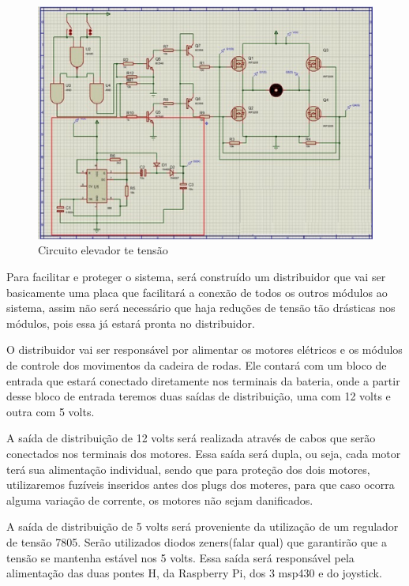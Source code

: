 \begin{figure}[!htb]
	\centering
	\includegraphics[keepaspectratio=true,scale=0.8]{figuras/referencialteorico/figurax_4.eps}
	\caption{Circuito elevador te tensão}
	\label{fig:figx+4}
\end{figure}


Para facilitar e proteger o sistema, será construído um distribuidor que vai ser basicamente uma placa que facilitará a conexão de todos os outros módulos ao sistema, assim não será necessário que haja reduções de tensão tão drásticas nos módulos, pois essa já estará pronta no distribuidor.

O distribuidor vai ser responsável por alimentar os motores elétricos e os módulos de controle dos movimentos da cadeira de rodas. Ele contará com um bloco de entrada que estará conectado diretamente nos terminais da bateria, onde a partir desse bloco de entrada teremos duas saídas de distribuição, uma com 12 volts e outra com 5 volts.

A saída de distribuição de 12 volts será realizada através de cabos que serão conectados nos terminais dos motores. Essa saída será dupla, ou seja, cada motor terá sua alimentação individual, sendo que para proteção dos dois motores, utilizaremos fuzíveis inseridos antes dos plugs dos moteres, para que caso ocorra alguma variação de corrente, os motores não sejam danificados.

A saída de distribuição de 5 volts será proveniente da utilização de um regulador de tensão 7805. Serão utilizados diodos zeners(falar qual) que garantirão que a tensão se mantenha estável nos 5 volts. Essa saída será responsável pela alimentação das duas pontes H, da Raspberry Pi, dos 3 msp430 e do joystick.

